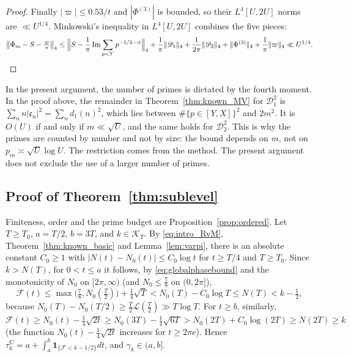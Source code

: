 \documentclass[11pt,a4paper]{article}
\makeatletter
\numberwithin{equation}{section}
\DeclareRobustCommand{\CGref}[1]{\ref{#1}}
\DeclareRobustCommand{\CGeqref}[1]{\eqref{#1}}
\let\CG@origref\ref
\let\CG@origeqref\eqref
\newcommand{\CG@gettip}[1]{\@ifundefined{CGTip@#1}{#1}{\csname CGTip@#1\endcsname}}
\DeclareRobustCommand{\CGref}[1]{\pdftooltip{\CG@origref{#1}}{\CG@gettip{#1}}}
\DeclareRobustCommand{\CGeqref}[1]{\pdftooltip{\CG@origeqref{#1}}{\CG@gettip{#1}}}
\theoremstyle{definition}
\theoremstyle{remark}
\newcommand{\Nz}{N_0} %
\newcommand{\lL}{\mathcal L}
\newcommand{\Fc}{\mathcal F}
\newcommand{\Ph}{\Phi}
\newcommand{\Ind}{\mathbf 1}
\newcommand{\Kc}{\mathcal K}
\makeatother
\begin{document}
\begin{proof}
Finally $|\varpi|\le0.53/t$ and $|\Ph^{(3)}|$ is bounded, so their $L^4[U,2U]$ norms are $\ll U^{1/4}$. Minkowski's inequality in $L^4[U,2U]$ combines the five pieces:
\begin{equation}
\bigl\|\Ph_m-S-\tfrac{\varpi}\pi\bigr\|_4\le\Bigl\|S-\frac1\pi\operatorname{Im}\sum_{p<Y}p^{-1/2-it}\Bigr\|_4+\frac1\pi\|\mathscr D_1\|_4+\frac1{2\pi}\|\mathscr D_2\|_4+\|\Ph^{(3)}\|_4+\frac1\pi\|\varpi\|_4\ll U^{1/4}.
\label{eq:disp_26}
\end{equation}
\end{proof}

In the present argument, the number of primes is dictated by the fourth moment. In the proof above, the remainder in Theorem~\CGref{thm:known_MV} for $\mathscr D_1^2$ is $\sum_nn|\mathfrak c_n|^2=\sum_nd_1(n)^2$, which lies between $\#\{p\in[Y,X]\}^2$ and $2m^2$. It is $O(U)$ if and only if $m\ll\sqrt U$, and the same holds for $\mathscr D_2^2$. This is why the primes are counted by number and not by size: the bound depends on $m$, not on $p_m\asymp\sqrt U\log U$. The restriction comes from the method. The present argument does not exclude the use of a larger number of primes.

\subsection{Proof of Theorem~\ref{thm:sublevel}}\label{subsec:proof_sublevel}
Finiteness, order and the prime budget are Proposition~\CGref{prop:ordered}. Let $T\ge T_0$, $a=T/2$, $b=3T$, and $k\in\Kc_T$. By \CGeqref{eq:intro_RvM}, Theorem~\CGref{thm:known_basic} and Lemma~\CGref{lem:varpi}, there is an absolute constant $C_0\ge1$ with $|N(t)-\Nz(t)|\le C_0\log t$ for $t\ge T/4$ and $T\ge T_0$. Since $k>N(T)$, for $0<t\le a$ it follows, by \CGeqref{eq:globalphasebound} and the monotonicity of $\Nz$ on $[2\pi,\infty)$ (and $\Nz\le\frac78$ on $(0,2\pi]$),
\begin{equation}
\Fc(t)\le\max\bigl(\tfrac78,\Nz(\tfrac T2)\bigr)+\tfrac14\sqrt T<\Nz(T)-C_0\log T\le N(T)<k-\tfrac12,
\label{eq:disp_27}
\end{equation}
because $\Nz(T)-\Nz(T/2)\ge\frac T2\lL(\frac T2)\gg T\log T$. For $t\ge b$, similarly, $\Fc(t)\ge\Nz(t)-\frac14\sqrt{2t}\ge\Nz(3T)-\frac14\sqrt{6T}>\Nz(2T)+C_0\log(2T)\ge N(2T)\ge k$ (the function $\Nz(t)-\frac14\sqrt{2t}$ increases for $t\ge2\pi e$). Hence $\tau_{k}^{\mathrm C}=a+\int_a^b\Ind_{\{\Fc<k-1/2\}}dt$, and $\gamma_k\in(a,b]$.
\end{document}
